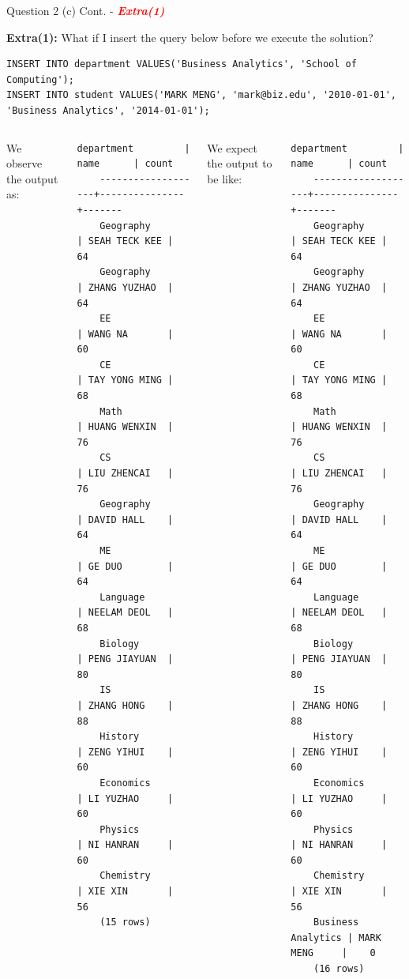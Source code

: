 \begin{frame}[fragile]{Question 2 (c) Cont. - \textcolor{red}{\textit{\textbf{Extra(1)}}}}
	
\textbf{Extra(1):} What if I insert the query below before we execute the solution?
\begin{lstlisting}[style=sql-small]
INSERT INTO department VALUES('Business Analytics', 'School of Computing');
INSERT INTO student VALUES('MARK MENG', 'mark@biz.edu', '2010-01-01', 'Business Analytics', '2014-01-01');
\end{lstlisting}

\begin{columns}[t]
We observe the output as:\\
\begin{lstlisting}[style=terminal-tiny]	
	department         |     name      | count
	-------------------+---------------+-------
	Geography          | SEAH TECK KEE |    64
	Geography          | ZHANG YUZHAO  |    64
	EE                 | WANG NA       |    60
	CE                 | TAY YONG MING |    68
	Math               | HUANG WENXIN  |    76
	CS                 | LIU ZHENCAI   |    76
	Geography          | DAVID HALL    |    64
	ME                 | GE DUO        |    64
	Language           | NEELAM DEOL   |    68
	Biology            | PENG JIAYUAN  |    80
	IS                 | ZHANG HONG    |    88
	History            | ZENG YIHUI    |    60
	Economics          | LI YUZHAO     |    60
	Physics            | NI HANRAN     |    60
	Chemistry          | XIE XIN       |    56
	(15 rows)
\end{lstlisting}

We expect the output to be like:\\
\begin{lstlisting}[style=terminal-tiny]	
	department         |     name      | count
	-------------------+---------------+-------
	Geography          | SEAH TECK KEE |    64
	Geography          | ZHANG YUZHAO  |    64
	EE                 | WANG NA       |    60
	CE                 | TAY YONG MING |    68
	Math               | HUANG WENXIN  |    76
	CS                 | LIU ZHENCAI   |    76
	Geography          | DAVID HALL    |    64
	ME                 | GE DUO        |    64
	Language           | NEELAM DEOL   |    68
	Biology            | PENG JIAYUAN  |    80
	IS                 | ZHANG HONG    |    88
	History            | ZENG YIHUI    |    60
	Economics          | LI YUZHAO     |    60
	Physics            | NI HANRAN     |    60
	Chemistry          | XIE XIN       |    56
	Business Analytics | MARK MENG     |    0
	(16 rows)
\end{lstlisting}

\end{columns}

\end{frame}

